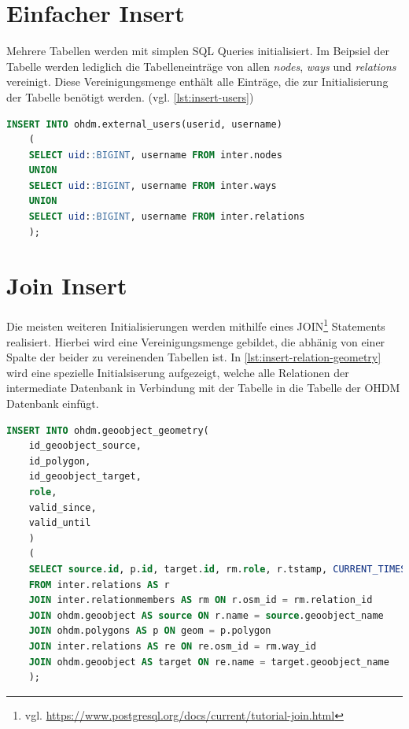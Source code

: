 \section{Einfacher Insert}
Mehrere Tabellen werden mit simplen SQL Queries initialisiert. Im Beipsiel der Tabelle  werden lediglich die Tabelleneinträge von allen \textit{nodes}, \textit{ways} und \textit{relations} vereinigt. Diese Vereinigungsmenge enthält alle Einträge, die zur Initialisierung der  Tabelle benötigt werden. (vgl. \autoref{lst:insert-users})

\begin{lstlisting}[language=SQL,caption={Insert Statement für die \gequote{external\_users} Tabelle},label={lst:insert-users}]
	INSERT INTO ohdm.external_users(userid, username) 
	(
	SELECT uid::BIGINT, username FROM inter.nodes
	UNION
	SELECT uid::BIGINT, username FROM inter.ways
	UNION
	SELECT uid::BIGINT, username FROM inter.relations
	);
\end{lstlisting}\vspace{1cm}
\section{Join Insert}
Die meisten weiteren Initialisierungen werden mithilfe eines JOIN\footnote{vgl. \url{https://www.postgresql.org/docs/current/tutorial-join.html}} Statements realisiert. Hierbei wird eine Vereinigungsmenge gebildet, die abhänig von einer Spalte der beider zu vereinenden Tabellen ist. In \autoref{lst:insert-relation-geometry} wird eine spezielle Initialsiserung aufgezeigt, welche alle Relationen der intermediate Datenbank in Verbindung mit der  Tabelle in die  Tabelle der OHDM Datenbank einfügt.\newpage

\begin{lstlisting}[language=SQL,caption={Insert Statement für die \gequote{geoobject\_geometry} Tabelle} auf Basis von allen Realationen der intermediate Datenbank,label={lst:insert-relation-geometry}]
	INSERT INTO ohdm.geoobject_geometry(
	id_geoobject_source, 
	id_polygon, 
	id_geoobject_target, 
	role, 
	valid_since, 
	valid_until
	)
	(
	SELECT source.id, p.id, target.id, rm.role, r.tstamp, CURRENT_TIMESTAMP
	FROM inter.relations AS r
	JOIN inter.relationmembers AS rm ON r.osm_id = rm.relation_id
	JOIN ohdm.geoobject AS source ON r.name = source.geoobject_name
	JOIN ohdm.polygons AS p ON geom = p.polygon
	JOIN inter.relations AS re ON re.osm_id = rm.way_id
	JOIN ohdm.geoobject AS target ON re.name = target.geoobject_name
	);
\end{lstlisting}